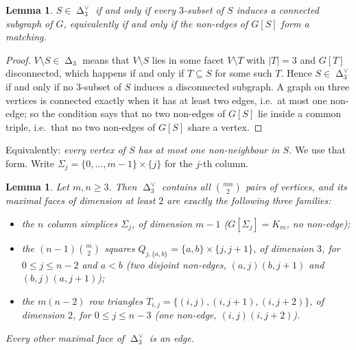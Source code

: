 \documentclass[11pt]{amsart}
\newtheorem{lemma}[theorem]{Lemma}
\DeclareMathOperator{\Cut}{\Delta}
\newcommand{\Dual}[1]{#1^{\vee}}
\begin{document}
\begin{lemma}\label{lem:matching}
$S \in \Dual{\Cut_3}$ if and only if every $3$-subset of $S$ induces a connected subgraph of $G$,
equivalently if and only if the non-edges of $G[S]$ form a matching.
\end{lemma}

\begin{proof}
$V \setminus S \in \Cut_3$ means that $V\setminus S$ lies in some facet $V\setminus T$ with
$|T|=3$ and $G[T]$ disconnected, which happens if and only if $T \subseteq S$ for some such $T$.
Hence $S \in \Dual{\Cut_3}$ if and only if no $3$-subset of $S$ induces a disconnected subgraph. A
graph on three vertices is connected exactly when it has at least two edges, i.e.\ at most one
non-edge; so the condition says that no two non-edges of $G[S]$ lie inside a common triple, i.e.\
that no two non-edges of $G[S]$ share a vertex.
\end{proof}

Equivalently: \emph{every vertex of $S$ has at most one non-neighbour in $S$.} We use that form.
Write $\Sigma_j = \{0,\dots,m-1\}\times\{j\}$ for the $j$-th column.

\begin{lemma}\label{lem:T0}
Let $m,n\ge3$. Then $\Dual{\Cut_3}$ contains all $\binom{mn}{2}$ pairs of vertices, and its
maximal faces of dimension at least $2$ are exactly the following three families:
\begin{itemize}
  \item the $n$ \emph{column simplices} $\Sigma_j$, of dimension $m-1$ \quad ($G[\Sigma_j]=K_m$,
        no non-edge);
  \item the $(n-1)\binom{m}{2}$ \emph{squares} $Q_{j,\{a,b\}} = \{a,b\}\times\{j,j+1\}$, of
        dimension $3$, for $0 \le j \le n-2$ and $a<b$ \quad (two disjoint non-edges,
        $(a,j)(b,j{+}1)$ and $(b,j)(a,j{+}1)$);
  \item the $m(n-2)$ \emph{row triangles} $T_{i,j} = \{(i,j),(i,j{+}1),(i,j{+}2)\}$, of
        dimension $2$, for $0\le j \le n-3$ \quad (one non-edge, $(i,j)(i,j{+}2)$).
\end{itemize}
Every other maximal face of $\Dual{\Cut_3}$ is an edge.
\end{lemma}
\end{document}
